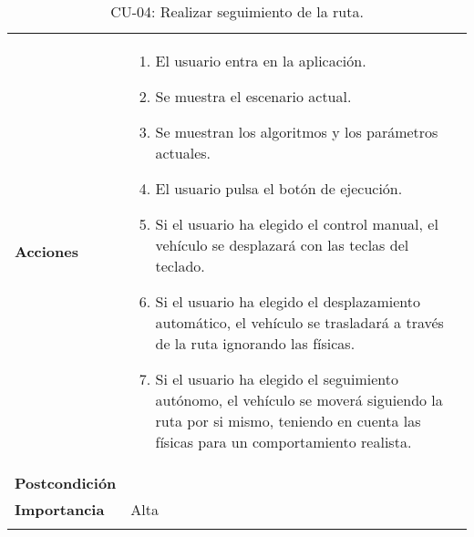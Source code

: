 \begin{longtable}[H]{@{}ll@{}}
\begin{minipage}[t]{0.23\columnwidth}\raggedright\strut
\textbf{Acciones}\strut
\end{minipage} & \begin{minipage}[t]{0.71\columnwidth}\raggedright\strut
\begin{enumerate}
\def\labelenumi{\arabic{enumi}.}
\tightlist
\item
  El usuario entra en la aplicación.
\item
  Se muestra el escenario actual.
\item
  Se muestran los algoritmos y los parámetros actuales.
\item
  El usuario pulsa el botón de ejecución.
\item
  Si el usuario ha elegido el control manual, el vehículo se desplazará con las teclas del teclado.
\item
  Si el usuario ha elegido el desplazamiento automático, el vehículo se trasladará a través de la ruta ignorando las físicas.
\item
  Si el usuario ha elegido el seguimiento autónomo, el vehículo se moverá siguiendo la ruta por si mismo, teniendo en cuenta las físicas para un comportamiento realista.
\end{enumerate}\strut
\end{minipage}\tabularnewline

\begin{minipage}[t]{0.23\columnwidth}\raggedright\strut
\textbf{Postcondición}\strut
\end{minipage} & \begin{minipage}[t]{0.71\columnwidth}\raggedright\strut
\strut
\end{minipage}\tabularnewline

\begin{minipage}[t]{0.23\columnwidth}\raggedright\strut
\textbf{Importancia}\strut
\end{minipage} & \begin{minipage}[t]{0.71\columnwidth}\raggedright\strut
Alta\strut
\end{minipage}\tabularnewline

\bottomrule
\caption{CU-04: Realizar seguimiento de la ruta.}
\end{longtable}
